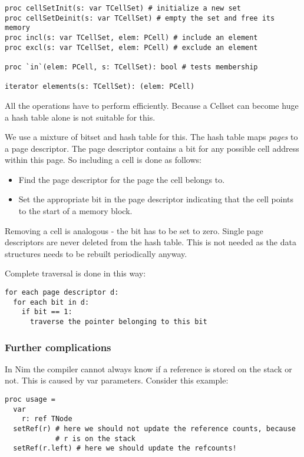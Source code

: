 \begin{verbatim}
proc cellSetInit(s: var TCellSet) # initialize a new set
proc cellSetDeinit(s: var TCellSet) # empty the set and free its memory
proc incl(s: var TCellSet, elem: PCell) # include an element
proc excl(s: var TCellSet, elem: PCell) # exclude an element

proc `in`(elem: PCell, s: TCellSet): bool # tests membership

iterator elements(s: TCellSet): (elem: PCell)
\end{verbatim}

All the operations have to perform efficiently. Because a Cellset can
become huge a hash table alone is not suitable for this.

We use a mixture of bitset and hash table for this. The hash table maps
\emph{pages} to a page descriptor. The page descriptor contains a bit
for any possible cell address within this page. So including a cell is
done as follows:

\begin{itemize}
\tightlist
\item
  Find the page descriptor for the page the cell belongs to.
\item
  Set the appropriate bit in the page descriptor indicating that the
  cell points to the start of a memory block.
\end{itemize}

Removing a cell is analogous - the bit has to be set to zero. Single
page descriptors are never deleted from the hash table. This is not
needed as the data structures needs to be rebuilt periodically anyway.

Complete traversal is done in this way:

\begin{verbatim}
for each page descriptor d:
  for each bit in d:
    if bit == 1:
      traverse the pointer belonging to this bit
\end{verbatim}

\hypertarget{further-complications}{%
\subsubsection{Further complications}\label{further-complications}}

In Nim the compiler cannot always know if a reference is stored on the
stack or not. This is caused by var parameters. Consider this example:

\begin{verbatim}
proc usage =
  var
    r: ref TNode
  setRef(r) # here we should not update the reference counts, because
            # r is on the stack
  setRef(r.left) # here we should update the refcounts!
\end{verbatim}

